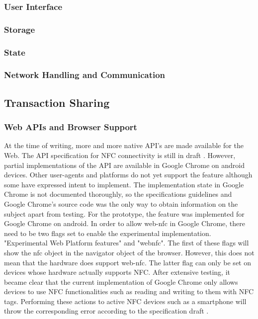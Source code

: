 \documentclass[a4paper]{article}
\begin{document}
\subsubsection{User Interface}
\subsubsection{Storage}
\subsubsection{State}
\subsubsection{Network Handling and Communication}

\subsection{Transaction Sharing}
\subsubsection{Web APIs and Browser Support}
At the time of writing, more and more native API's are made available for the Web.
The API specification for NFC connectivity is still in draft \cite{web-nfc}. However, partial implementations of the API are available in Google Chrome on android devices. Other user-agents and platforms do not yet support the feature although some have expressed intent to implement. The implementation state in Google Chrome is not documented thoroughly, so the specifications guidelines and Google Chrome's source code was the only way to obtain information on the subject apart from testing.
For the prototype, the feature was implemented for Google Chrome on android.
In order to allow web-nfc in Google Chrome, there need to be two flags set to enable the experimental implementation.
"Experimental Web Platform features" and "webnfc". The first of these flags will show the nfc object in the navigator object of the browser. However, this does not mean that the hardware does support web-nfc. The latter flag can only be set on devices whose hardware actually supports NFC.
After extensive testing, it became clear that the current implementation of Google Chrome only allows devices to use NFC functionalities such as reading and writing to them with NFC tags. Performing these actions to active NFC devices such as a smartphone will throw the corresponding error according to the specification draft \cite{web-nfc}.
\end{document}
